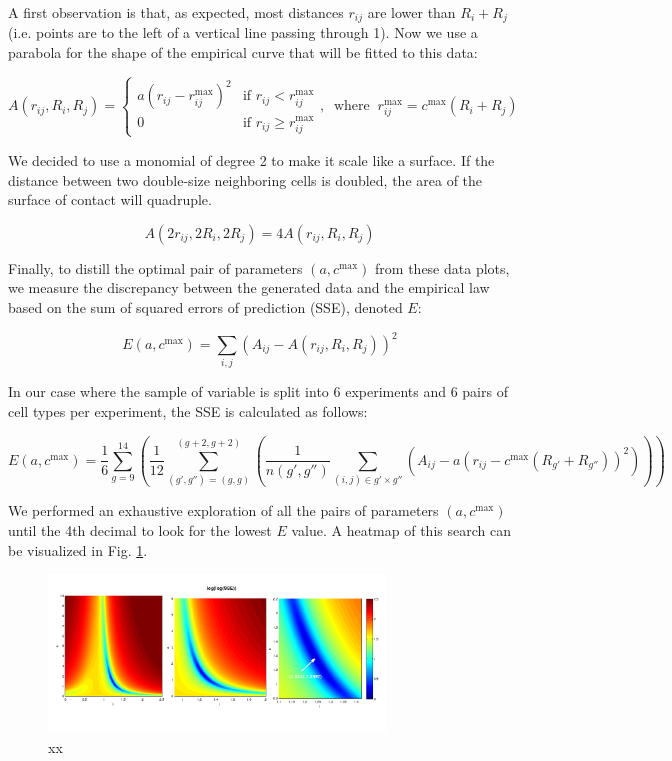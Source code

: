 A first observation is that, as expected, most distances $r_{ij}$ are lower than $R_i+R_j$ (i.e. points are to the left of a vertical line passing through 1). Now we use a parabola for the shape of the empirical curve that will be fitted to this data:

$$A(r_{ij},R_i,R_j) = \begin{cases} a\left(r_{ij} - r^{\mathrm{max}}_{ij}\right)^2 &     \text{if }r_{ij} \lt r^{\mathrm{max}}_{ij} \\ 0 & \text{if }r_{ij} \geq r^{\mathrm{max}}_{ij} \end{cases}, \;\;\text{where}\;\; r^{\mathrm{max}}_{ij} = c^{\mathrm{max}}(R_i+R_j)$$

We decided to use a monomial of degree 2 to make it scale like a surface. If the distance between two double-size neighboring cells is doubled, the area of the surface of contact will quadruple.

$$A(2r_{ij},2R_i,2R_j) = 4 A(r_{ij},R_i,R_j)$$

Finally, to distill the optimal pair of parameters $(a, c^{\mathrm{max}})$ from these data plots, we measure the discrepancy between the generated data and the empirical law based on the sum of squared errors of prediction (SSE), denoted $E$:

$$E(a,c^{\mathrm{max}}) = \sum_{i,j} \left(A_{ij} - A(r_{ij},R_i,R_j) \right)^2$$

In our case where the sample of variable is split into 6 experiments and 6 pairs of cell types per experiment, the SSE is calculated as follows:

$$E(a,c^{\mathrm{max}}) = \frac{1}{6} \sum_{g = 9}^{14} \left( \frac{1}{12} \sum_{(g',g'')=(g,g)}^{(g+2,g+2)} \left( \frac{1}{n(g',g'')} \sum_{(i,j)\in g'\times g''} \left( A_{ij} - a\left(r_{ij} - c^{\mathrm{max}}(R_{g'}+R_{g''})\right)^2 \right) \right) \right)$$

We performed an exhaustive exploration of all the pairs of parameters $(a,c^{\mathrm{max}})$ until the 4th decimal to look for the lowest $E$ value. A heatmap of this search can be visualized in Fig. \ref{spatial_neighb_zoomALL}.
\begin{figure}
\begin{center}
\includegraphics[width=0.8\textwidth]{../../images/MECAGEN/spatial_neighb/zoomALL.png}
\end{center}
\caption{xx}
\label{spatial_neighb_zoomALL}
\end{figure}

